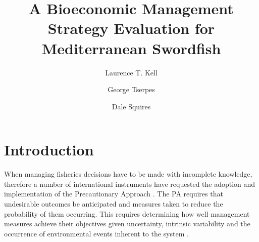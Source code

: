 \documentclass[%
nonumbib,      %
%
]{nrc1}                          %
\begin{document}





\title{A Bioeconomic Management Strategy Evaluation for Mediterranean Swordfish}

\author{Laurence T. Kell}        
\address{ICCAT Secretariat, C/Coraz\'{o}n de Mar\'{\i}a, 8. 28002 Madrid, Spain; ~Laurie.Kell@iccat.int; ~Phone: +34 914 165 600 ~Fax: +34 914 152 612.}
        
\author{George Tserpes}          
\address{{Hellenic Centre for Marine Research (HCMR), Institute of Marine biological Resources, P.O. Box 2214, 71003 Poros, Heraklion, Greece, tel: +30 2810 337851, fax: +30 2810 337820, e-mail: gtserpes@her.hcmr.gr}}

\author{Dale Squires}          
\address{{Southwest Fisheries Science Center, 8604 La Jolla Shores Drive, La Jolla, CA 92037-1508}}




\begin{abstract}


\end{abstract}

\begin{resume}
\end{resume}

\maketitle

\section*{Introduction}

When managing fisheries decisions have to be made with incomplete knowledge, therefore a number of international instruments have requested the adoption and implementation of the Precautionary Approach \citep[PA,][]{garcia1996precautionary}. The PA requires that undesirable outcomes be anticipated and measures taken to reduce the probability of them occurring.  This requires determining how well management measures achieve their objectives given uncertainty, intrinsic variability and the occurrence of environmental events inherent to the system \citep{kirkwood1995assessing}. 
\end{document}
